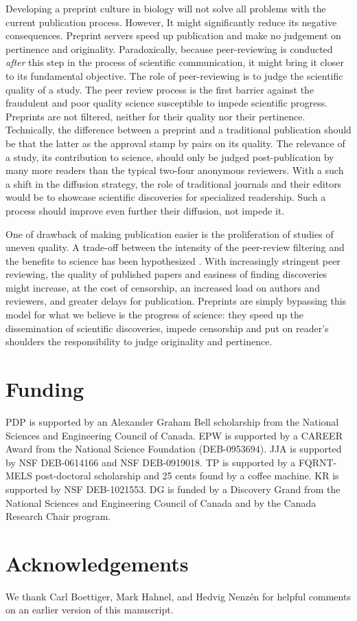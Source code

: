 \documentclass[letterpaper,twocolumn,superscriptaddress,showkeys,longbibliography]{revtex4-1}
\begin{document}
Developing a preprint culture in biology will not solve all problems with the
current publication process. However, It might significantly reduce its negative
consequences. Preprint servers speed up publication and make no judgement on
pertinence and originality. Paradoxically, because peer-reviewing is conducted
\emph{after} this step in the process of scientific communication, it might
bring it closer to its fundamental objective. The role of peer-reviewing is to
judge the scientific quality of a study. The peer review process is the first
barrier against the fraudulent and poor quality science susceptible to impede
scientific progress. Preprints are not filtered, neither for their quality nor
their pertinence.  Technically, the difference between a preprint and a
traditional publication should be that the latter as the approval stamp by pairs
on its quality. The relevance of a study, its contribution to science, should
only be judged post-publication by many more readers than the typical two-four
anonymous reviewers. With a such a shift in the diffusion strategy, the role of
traditional journals and their editors would be to showcase scientific
discoveries for specialized readership. Such a process should improve even
further their diffusion, not impede it. 

One of drawback of making publication easier is the proliferation of studies of
uneven quality. A trade-off between the intensity of the peer-review filtering
and the benefits to science has been hypothesized \cite{Aarssen2012}.  With
increasingly stringent peer reviewing, the quality of published papers and
easiness of finding discoveries might increase, at the cost of censorship, an
increased load on authors and reviewers, and greater delays for publication.
Preprints are simply bypassing this model for what we believe is the progress of
science: they speed up the dissemination of scientific discoveries, impede
censorship and put on reader's shoulders the responsibility to judge originality
and pertinence.

\section{Funding}

PDP is supported by an Alexander Graham Bell scholarship from the National
Sciences and Engineering Council of Canada. EPW is supported by a CAREER Award
from the National Science Foundation (DEB-0953694). JJA is supported by NSF
DEB-0614166 and NSF DEB-0919018.  TP is supported by a FQRNT-MELS post-doctoral
scholarship and 25 cents found by a coffee machine.  KR is supported by NSF
DEB-1021553. DG is funded by a Discovery Grand from the National Sciences and
Engineering Council of Canada and by the Canada Research Chair program.

\section{Acknowledgements}

We thank Carl Boettiger, Mark Hahnel, and Hedvig Nenz\'en for helpful comments on an earlier
version of this manuscript.

\newpage

\end{document}
